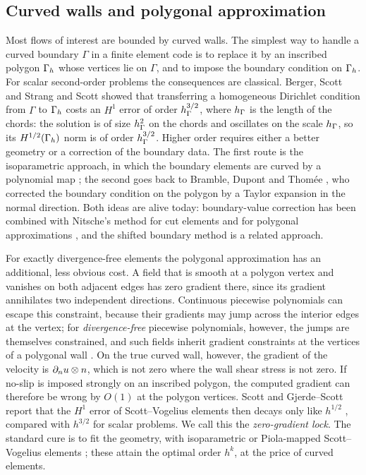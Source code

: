 \subsection{Curved walls and polygonal approximation}
Most flows of interest are bounded by curved walls. The simplest way to handle a curved boundary $\Gamma$ in a finite element code is to replace it by an inscribed polygon $\Gamma_h$ whose vertices lie on $\Gamma$, and to impose the boundary condition on $\Gamma_h$. For scalar second-order problems the consequences are classical. Berger, Scott and Strang \cite{BergerScottStrang1972} and Scott \cite{Scott1975} showed that transferring a homogeneous Dirichlet condition from $\Gamma$ to $\Gamma_h$ costs an $H^1$ error of order $h_\Gamma^{3/2}$, where $h_\Gamma$ is the length of the chords: the solution is of size $h_\Gamma^2$ on the chords and oscillates on the scale $h_\Gamma$, so its $H^{1/2}(\Gamma_h)$ norm is of order $h_\Gamma^{3/2}$. Higher order requires either a better geometry or a correction of the boundary data. The first route is the isoparametric approach, in which the boundary elements are curved by a polynomial map \cite{Ciarlet1978book}; the second goes back to Bramble, Dupont and Thom\'ee \cite{BrambleDupontThomee1972}, who corrected the boundary condition on the polygon by a Taylor expansion in the normal direction. Both ideas are alive today: boundary-value correction has been combined with Nitsche's method for cut elements \cite{BurmanHansboLarson2018,BurmanHansboLarson2019Stokes} and for polygonal approximations \cite{DupontGuzmanScott2025}, and the shifted boundary method \cite{MainScovazzi2018} is a related approach.

For exactly divergence-free elements the polygonal approximation has an additional, less obvious cost. A field that is smooth at a polygon vertex and vanishes on both adjacent edges has zero gradient there, since its gradient annihilates two independent directions. Continuous piecewise polynomials can escape this constraint, because their gradients may jump across the interior edges at the vertex; for \emph{divergence-free} piecewise polynomials, however, the jumps are themselves constrained, and such fields inherit gradient constraints at the vertices of a polygonal wall \cite{ScottPrize,GjerdeScott2024}. On the true curved wall, however, the gradient of the velocity is $\partial_n u\otimes n$, which is not zero where the wall shear stress is not zero. If no-slip is imposed strongly on an inscribed polygon, the computed gradient can therefore be wrong by $O(1)$ at the polygon vertices. Scott and Gjerde--Scott report that the $H^1$ error of Scott--Vogelius elements then decays only like $h^{1/2}$ \cite{ScottPrize,GjerdeScott2024}, compared with $h^{3/2}$ for scalar problems. We call this the \emph{zero-gradient lock}. The standard cure is to fit the geometry, with isoparametric or Piola-mapped Scott--Vogelius elements \cite{NeilanOtus2021,DurstNeilan2024}; these attain the optimal order $h^k$, at the price of curved elements.

